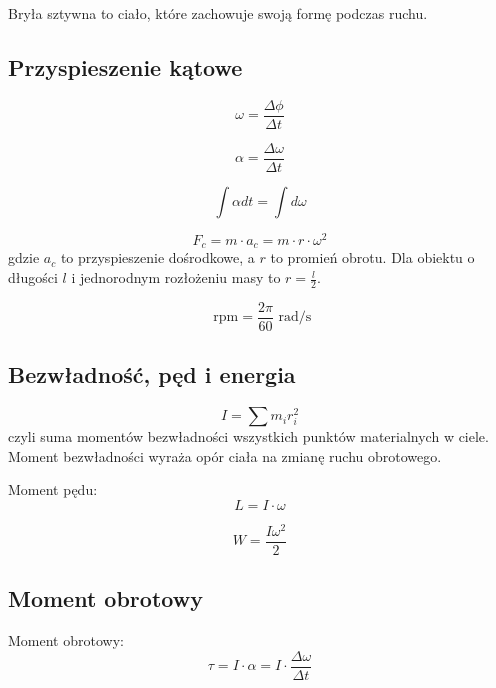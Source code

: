 \documentclass{../notatki}
\begin{document}
Bryła sztywna to ciało, które zachowuje swoją formę podczas ruchu.

\subsection{Przyspieszenie kątowe}

\begin{figure*}[h]
  \centering
\end{figure*}

$$
\omega = \frac{\Delta \phi}{\Delta t}
$$

$$
\alpha = \frac{\Delta \omega}{\Delta t}
$$

$$
\int \alpha dt = \int d\omega
$$

$$
F_c = m \cdot a_c = m \cdot r \cdot \omega^2
$$
gdzie $a_c$ to przyspieszenie dośrodkowe, a $r$ to promień obrotu. Dla obiektu
o długości $l$ i jednorodnym rozłożeniu masy to $r = \frac{l}{2}$.

$$
\text{ rpm} = \frac{2\pi}{60} \text{ rad/s}
$$

\subsection{Bezwładność, pęd i energia}

$$
I = \sum m_i r_i^2
$$
czyli suma momentów bezwładności wszystkich punktów materialnych w ciele.
Moment bezwładności wyraża opór ciała na zmianę ruchu obrotowego.

Moment pędu:
$$
L = I \cdot \omega
$$

$$
W = \frac{I\omega^2}{2}
$$

\subsection{Moment obrotowy}

Moment obrotowy:
$$
\tau = I \cdot \alpha = I \cdot \frac{\Delta \omega}{\Delta t}
$$
\end{document}
